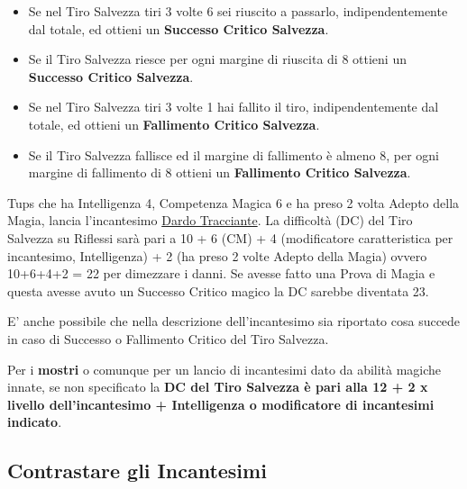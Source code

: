 \begin{multicols}{2}
\begin{itemize}[leftmargin=*]
\item
Se nel Tiro Salvezza tiri 3 volte 6 sei riuscito a passarlo, indipendentemente dal totale, ed ottieni un \textbf{Successo Critico Salvezza}.

\item
Se il Tiro Salvezza riesce per ogni margine di riuscita di 8 ottieni un \textbf{Successo Critico Salvezza}.

\item
Se nel Tiro Salvezza tiri 3 volte 1 hai fallito il tiro, indipendentemente dal totale, ed ottieni un \textbf{Fallimento Critico Salvezza}.

\item
Se il Tiro Salvezza fallisce ed il margine di fallimento è almeno 8, per ogni margine di fallimento di 8 ottieni un \textbf{Fallimento Critico Salvezza}.

\end{itemize}

\begin{giocatore}
Tups che ha Intelligenza 4, Competenza Magica 6 e ha preso 2 volta Adepto della Magia, lancia l'incantesimo \hyperlink{Dardo Tracciante}{Dardo Tracciante}. La difficoltà (DC) del Tiro Salvezza su Riflessi sarà pari a 10 + 6 (CM) + 4 (modificatore caratteristica per incantesimo, Intelligenza) + 2 (ha preso 2 volte Adepto della Magia) ovvero 10+6+4+2 = 22 per dimezzare i danni. Se avesse fatto una Prova di Magia e questa avesse avuto un Successo Critico magico la DC sarebbe diventata 23.
\end{giocatore}

E' anche possibile che nella descrizione dell'incantesimo sia riportato cosa succede in caso di Successo o Fallimento Critico del Tiro Salvezza.

Per i \textbf{mostri} o comunque per un lancio di incantesimi dato da abilità magiche innate, se non specificato la \textbf{DC del Tiro Salvezza è pari alla 12 + 2 x livello dell'incantesimo + Intelligenza o modificatore di incantesimi indicato}.\label{tirosalvezzainccmostro}

\subsection{Contrastare gli Incantesimi}\label{contrastareincantesimi}\hypertarget{contrastareincantesimi}{}


\end{multicols}
